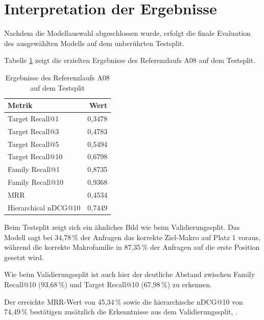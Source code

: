 
\section{Interpretation der Ergebnisse}

Nachdem die Modellauswahl abgeschlossen wurde, erfolgt die finale Evaluation des ausgewählten Modells auf dem unberührten Testsplit.

Tabelle \ref{tab:test_ergebnisse} zeigt die erzielten Ergebnisse des Referenzlaufs A08 auf dem Testsplit. 

\begin{table}[H] 
  \centering 
  \caption{Ergebnisse des Referenzlaufs A08 auf dem Testsplit} 
  \label{tab:test_ergebnisse} 
  \begin{tabular}{lr} \toprule \textbf{Metrik} & \textbf{Wert} \\ \midrule 
    Target Recall@1 & 0,3478 \\
    Target Recall@3 & 0,4783 \\
    Target Recall@5 & 0,5494 \\
    Target Recall@10 & 0,6798 \\
    Family Recall@1 & 0,8735 \\
    Family Recall@10 & 0,9368 \\
    MRR & 0,4534 \\
    Hierarchical nDCG@10 & 0,7449 \\
    \bottomrule 
  \end{tabular} 
\end{table}

Beim Testsplit zeigt sich ein ähnliches Bild wie beim Validierungssplit. Das Modell sagt bei 34,78\,\% der Anfragen das korrekte Ziel-Makro \parencite{EPLAN-Makros} auf Platz 1 voraus, während die korrekte Makrofamilie in 87,35\,\% der Anfragen auf die erste Position gesetzt wird.

Wie beim Validierungssplit ist auch hier der deutliche Abstand zwischen Family Recall@10 (93,68\,\%) und Target Recall@10 (67,98\,\%) zu erkennen. 

Der erreichte MRR-Wert von 45,34\,\% sowie die hierarchische nDCG@10 von 74,49\,\% bestätigen zusätzlich die Erkenntnisse aus dem Validierungssplit, \parencite{LTR_Configuration_Test_Series}.

